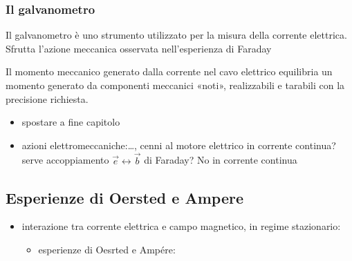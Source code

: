 \documentclass[letterpaper,10pt,italian]{jupyterBook}
\begin{document}
\subsubsection{Il galvanometro}
\label{\detokenize{ch/electromagnetism/electromagnetism-steady:il-galvanometro}}\label{\detokenize{ch/electromagnetism/electromagnetism-steady:physics-hs-electromagnetism-electromagnetism-steady-experience-faraday-galvanometer}}
\sphinxAtStartPar
Il galvanometro è uno strumento utilizzato per la misura della corrente elettrica. Sfrutta l’azione meccanica osservata nell’esperienza di Faraday

\sphinxAtStartPar
Il momento meccanico generato dalla corrente nel cavo elettrico equilibria un momento generato da componenti meccanici «noti», realizzabili e tarabili con la precisione richiesta.

\sphinxAtStartPar
{} 
\begin{itemize}
\item {} 
\sphinxAtStartPar
spostare a fine capitolo

\item {} 
\sphinxAtStartPar
azioni elettro\sphinxhyphen{}meccaniche:…, cenni al motore elettrico in corrente continua? serve accoppiamento \(\vec{e} \leftrightarrow \vec{b}\) di Faraday? No in corrente continua

\end{itemize}


\subsection{Esperienze di Oersted e Ampere}
\label{\detokenize{ch/electromagnetism/electromagnetism-steady:esperienze-di-oersted-e-ampere}}\label{\detokenize{ch/electromagnetism/electromagnetism-steady:physics-hs-electromagnetism-electromagnetism-steady-experience-oersted-ampere}}\begin{itemize}
\item {} 
\sphinxAtStartPar
interazione tra corrente elettrica e campo magnetico, in regime stazionario:
\begin{itemize}
\item {} 
\sphinxAtStartPar
esperienze di Oesrted e Ampére:

\end{itemize}

\end{itemize}
\end{document}
